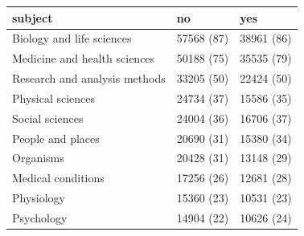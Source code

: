 \begin{table}[ht]
\centering
\begin{tabular}{lll}
 subject & no & yes \\ 
  \hline
Biology and life sciences & 57568 (87) & 38961 (86) \\ 
  Medicine and health sciences & 50188 (75) & 35535 (79) \\ 
  Research and analysis methods & 33205 (50) & 22424 (50) \\ 
  Physical sciences & 24734 (37) & 15586 (35) \\ 
  Social sciences & 24004 (36) & 16706 (37) \\ 
  People and places & 20690 (31) & 15380 (34) \\ 
  Organisms & 20428 (31) & 13148 (29) \\ 
  Medical conditions & 17256 (26) & 12681 (28) \\ 
  Physiology & 15360 (23) & 10531 (23) \\ 
  Psychology & 14904 (22) & 10626 (24) \\ 
  \end{tabular}
\end{table}
